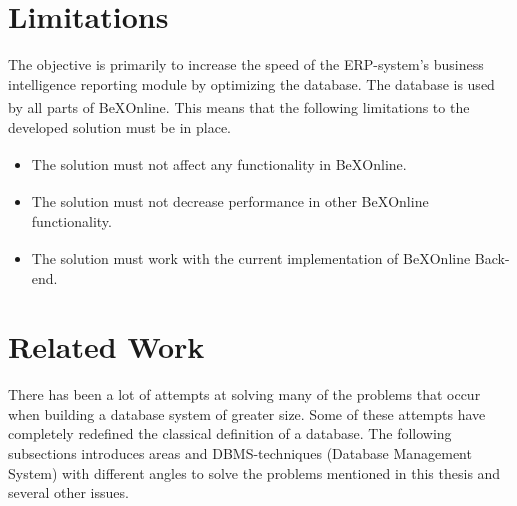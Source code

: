 \documentclass{cslthse-msc}
\newcommand{\bex}{BeX\textsuperscript{\textregistered}}
\begin{document}
\section{Limitations}\label{sec:limi}
The objective is primarily to increase the speed of the ERP-system's business intelligence reporting module by optimizing the database. The database is used by all parts of \bex Online. This means that the following limitations to the developed solution must be in place.

\begin{itemize}
\item The solution must not affect any functionality in \bex Online.
\item The solution must not decrease performance in other \bex Online functionality.
\item The solution must work with the current implementation of \bex Online Back-end.
\end{itemize}

\section{Related Work}\label{sec:related}
There has been a lot of attempts at solving many of the problems that occur when building a database system of greater size. Some of these attempts have completely redefined the classical definition of a database. The following subsections introduces areas and DBMS-techniques (Database Management System) with different angles to solve the problems mentioned in this thesis and several other issues.
\end{document}
